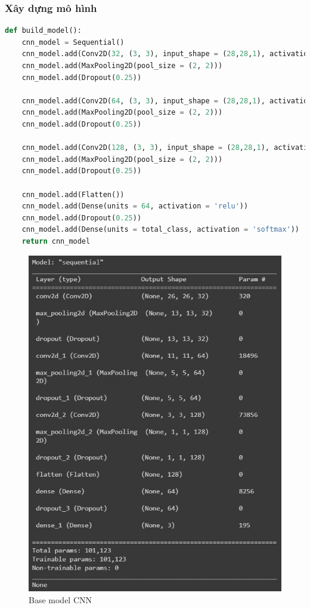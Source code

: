 \subsubsection{Xây dựng mô hình}
\begin{lstlisting}[language = python]
def build_model():
    cnn_model = Sequential()
    cnn_model.add(Conv2D(32, (3, 3), input_shape = (28,28,1), activation='relu'))
    cnn_model.add(MaxPooling2D(pool_size = (2, 2)))
    cnn_model.add(Dropout(0.25))

    cnn_model.add(Conv2D(64, (3, 3), input_shape = (28,28,1), activation='relu'))
    cnn_model.add(MaxPooling2D(pool_size = (2, 2)))
    cnn_model.add(Dropout(0.25))

    cnn_model.add(Conv2D(128, (3, 3), input_shape = (28,28,1), activation='relu'))
    cnn_model.add(MaxPooling2D(pool_size = (2, 2)))
    cnn_model.add(Dropout(0.25))

    cnn_model.add(Flatten())
    cnn_model.add(Dense(units = 64, activation = 'relu'))
    cnn_model.add(Dropout(0.25))
    cnn_model.add(Dense(units = total_class, activation = 'softmax'))
    return cnn_model
\end{lstlisting}
\newpage
\begin{center}
    \begin{figure}[!h]
        \centering
        \includegraphics[scale = 0.75]{fileanh/9.jpg}
        \caption{Base model CNN}
    \end{figure}
\end{center}
